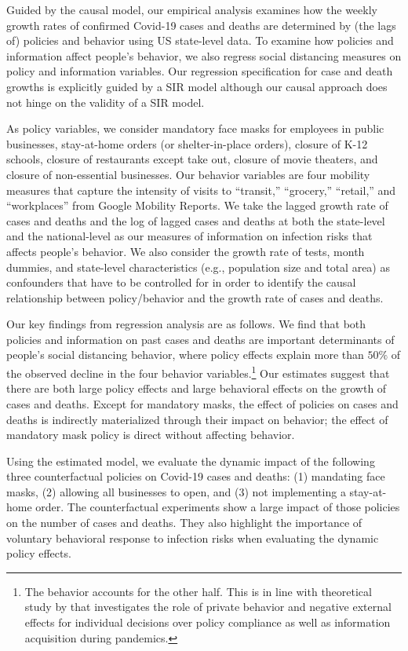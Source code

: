 \documentclass[3p, longtitle]{elsarticle}
\theoremstyle{definition}
\begin{document}
Guided by the causal model, our empirical analysis examines how the weekly growth rates of confirmed Covid-19 cases and deaths are determined by (the lags of) policies and behavior using US state-level data. To examine how policies and information affect people's behavior, we also regress social distancing measures  on policy and information variables. Our regression specification for case and death growths is explicitly guided by a SIR model although  our causal approach does not hinge on the validity of a SIR model.


As policy variables, we consider  mandatory face masks for employees in public businesses, stay-at-home orders (or shelter-in-place orders), closure of K-12 schools, closure of restaurants except take out, closure of movie theaters, and closure of non-essential businesses. Our behavior variables are four mobility measures that capture the intensity of visits to ``transit,'' ``grocery,'' ``retail,'' and ``workplaces''  from Google Mobility Reports. We take the lagged growth rate of cases and deaths and the log of lagged cases and deaths at both the state-level and the national-level as our measures of information on infection risks that affects people's  behavior. We also consider the growth rate of tests, month dummies, and state-level characteristics (e.g., population size and total area) as confounders that have to be controlled for in order to identify the causal relationship between policy/behavior and the growth rate of cases and deaths.

Our key findings from regression analysis are as follows.  We find
that both policies and information on past cases and deaths are important
determinants of people's social distancing behavior, where policy
effects explain more than $50\%$ of the observed decline in the four
behavior variables.\footnote{The behavior accounts for the other half. This is in line with theoretical study by \cite{gitmez2020} that investigates the role of private behavior and
negative external effects for individual decisions over policy compliance as well as information acquisition during pandemics.} Our estimates suggest that there are both large policy effects and large behavioral effects on the growth of cases and deaths. Except for mandatory masks, the effect of policies on cases and deaths is indirectly materialized through their impact on behavior; the effect of mandatory mask policy is direct without affecting behavior.


Using the estimated model, we evaluate the dynamic impact of the following three counterfactual policies on Covid-19 cases and deaths: (1) mandating face masks, (2)  allowing all businesses to open, and (3) not implementing a stay-at-home order.  The counterfactual experiments show a large impact of  those policies on  the number of cases and deaths.  They also highlight the importance of voluntary behavioral response to infection risks when evaluating the dynamic policy effects.
\end{document}
